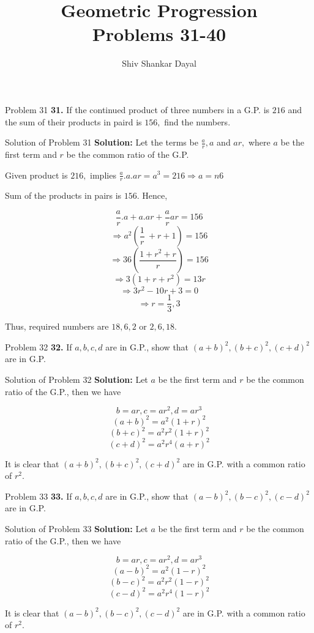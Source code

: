 \documentclass[aspectratio=1610,8pt]{beamer}
\title{Geometric Progression\\Problems 31-40}
\author[Shiv Shankar Dayal]{Shiv Shankar Dayal}
\begin{document}
\begin{frame}
       \titlepage
\end{frame}
\begin{frame}{Problem 31}
  \textbf{31.} If the continued product of three numbers in a G.P. is $216$ and
  the sum of their products in paird is $156,$ find the numbers.
\end{frame}
\begin{frame}{Solution of Problem 31}
  \textbf{Solution:} Let the terms be $\frac{a}{r}, a$ and $ar,$ where $a$ be
  the first term and $r$ be the common ratio of the G.P.

  Given product is $216,$ implies $\frac{a}{r}.a.ar = a^3 = 216 \Rightarrow a =n6$

  Sum of the products in pairs is $156.$ Hence,

  $$\frac{a}{r}.a + a.ar + \frac{a}{r}ar = 156$$
  $$\Rightarrow a^2\left(\frac{1}{r}\ + r + 1\right) = 156$$
  $$\Rightarrow 36\left(\frac{1 + r^2 + r}{r}\right) = 156$$
  $$\Rightarrow 3(1 + r + r^2) = 13r$$
  $$\Rightarrow 3r^2 - 10r + 3 = 0$$
  $$\Rightarrow r = \frac{1}{3}, 3$$

  Thus, required numbers are $18, 6, 2$ or $2, 6, 18.$
\end{frame}
\begin{frame}{Problem 32}
  \textbf{32.} If $a, b, c, d$ are in G.P., show that $(a + b)^2, (b + c)^2, (c
  + d)^2$ are in G.P.
\end{frame}
\begin{frame}{Solution of Problem 32}
  \textbf{Solution:} Let $a$ be the first term and $r$ be the common ratio of
  the G.P., then we have

  $$b = ar, c = ar^2, d = ar^3$$
  $$(a + b)^2 = a^2(1 + r)^2$$
  $$(b + c)^2 = a^2r^2(1 + r)^2$$
  $$(c + d)^2 = a^2r^4(a + r)^2$$

  It is clear that $(a + b)^2, (b + c)^2, (c + d)^2$ are in G.P. with a common
  ratio of $r^2.$
\end{frame}
\begin{frame}{Problem 33}
  \textbf{33.} If $a, b, c, d$ are in G.P., show that $(a - b)^2, (b - c)^2, (c
  - d)^2$ are in G.P.
\end{frame}
\begin{frame}{Solution of Problem 33}
  \textbf{Solution:} Let $a$ be the first term and $r$ be the common ratio of
  the G.P., then we have

  $$b = ar, c = ar^2, d = ar^3$$
  $$(a - b)^2 = a^2(1 - r)^2$$
  $$(b - c)^2 = a^2r^2(1 - r)^2$$
  $$(c - d)^2 = a^2r^4(1 - r)^2$$

  It is clear that $(a - b)^2, (b - c)^2, (c - d)^2$ are in G.P. with a common
  ratio of $r^2.$
\end{frame}
\end{document}
